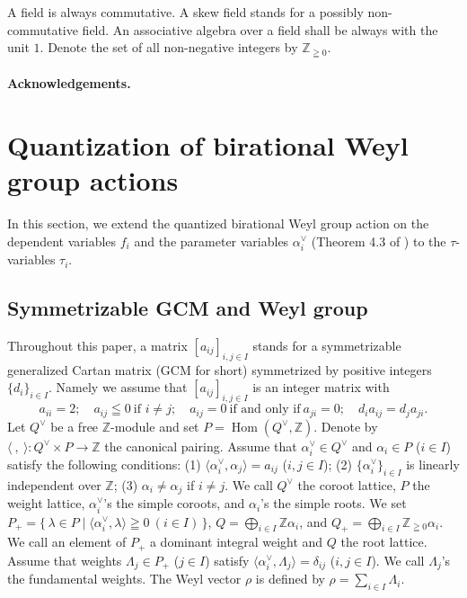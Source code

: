 \documentclass[12pt,twoside]{article}
\newcommand\bra{\langle}
\newcommand\ket{\rangle}
\newcommand\Hom{\mathop{\mathrm{Hom}}\nolimits}
\newcommand\av{\alpha^\vee}
\newcommand\Qv{Q^\vee}
\newcommand\Z{{\mathbb Z}} %
\theoremstyle{plain} %
\theoremstyle{definition} %
\theoremstyle{definition} %
\numberwithin{theorem}{section}
\numberwithin{equation}{section}
\numberwithin{figure}{section}
\numberwithin{table}{section}
\begin{document}
A field is always commutative.
A skew field stands for a possibly non-commutative field.
An associative algebra over a field shall be always with the unit $1$.
Denote the set of all non-negative integers by $\Z_{\geqq0}$.


\paragraph{Acknowledgements.}
\ACKNOWLEDGEMENTS


\section{Quantization of birational Weyl group actions}
\label{sec:QBWGA}

In this section, we extend 
the quantized birational Weyl group action
on the dependent variables $f_i$ and the parameter variables $\av_i$
(Theorem 4.3 of \cite{Kuroki2008}) to the $\tau$-variables $\tau_i$.


\subsection{Symmetrizable GCM and Weyl group}
\label{sec:GCM}

Throughout this paper, 
a matrix $[a_{ij}]_{i,j\in I}$ stands for 
a symmetrizable generalized Cartan matrix 
(GCM for short) symmetrized by positive integers $\{d_i\}_{i\in I}$.
Namely we assume that $[a_{ij}]_{i,j\in I}$ is an integer matrix with
\begin{equation*}
 a_{ii}=2; \quad
 a_{ij}\leqq 0\ \text{if $i\ne j$}; \quad
 a_{ij}=0\ \text{if and only if}\ a_{ji}=0; \quad
 d_ia_{ij} = d_ja_{ji}.
\end{equation*}
Let $\Qv$ be a free $\Z$-module and set $P=\Hom(\Qv,\Z)$.
Denote by $\bra\ ,\ \ket:\Qv\times P\to\Z$ the canonical pairing.
Assume that $\av_i\in \Qv$ and $\alpha_i\in P$ ($i\in I$) 
satisfy the following conditions:
(1) $\bra\av_i,\alpha_j\ket=a_{ij}$ ($i,j\in I$);
(2) $\{\av_i\}_{i\in I}$ is linearly independent over $\Z$;
(3) $\alpha_i\ne\alpha_j$ if $i\ne j$.
We call $\Qv$ the coroot lattice, $P$ the weight lattice, 
$\av_i$'s the simple coroots, and $\alpha_i$'s the simple roots.
We set $P_+=\{\,\lambda\in P\mid\bra\av_i,\lambda\ket\geqq 0\ (i\in I)\,\}$,
$Q=\bigoplus_{i\in I}\Z\alpha_i$, and
$Q_+=\bigoplus_{i\in I}\Z_{\geqq 0}\alpha_i$.
We call an element of $P_+$ a dominant integral weight
and $Q$ the root lattice.
Assume that weights $\Lambda_j\in P_+$ ($j\in I$) satisfy
$\bra\av_i,\Lambda_j\ket=\delta_{ij}$ ($i,j\in I$).
We call $\Lambda_j$'s the fundamental weights.
The Weyl vector $\rho$ is defined by $\rho=\sum_{i\in I}\Lambda_i$.
\end{document}
